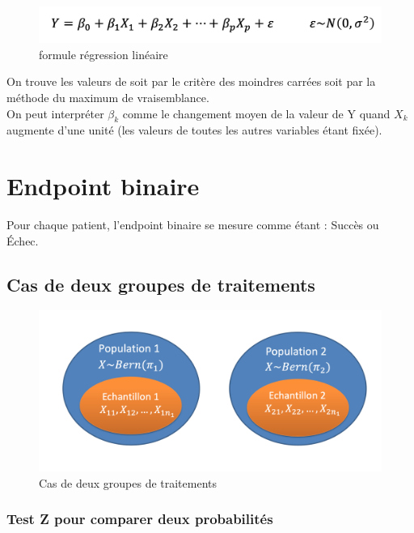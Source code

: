\begin{figure}[H]
    \centering
    \includegraphics[scale = 0.5]{images/regressionlineaire.png}
    \caption{formule régression linéaire}
    \label{fig:my_label}
\end{figure}
On trouve les valeurs de  soit par le critère des moindres carrées soit par la méthode du maximum de vraisemblance.\\

On peut interpréter $\beta_k$ comme le changement moyen de la valeur de Y quand $X_{k}$ augmente d’une unité (les valeurs de toutes les autres variables étant fixée).

\section{Endpoint binaire}
Pour chaque patient, l’endpoint binaire se mesure comme étant : Succès ou Échec. 

\subsection{Cas de deux groupes de traitements}

\begin{figure}[H]
    \centering
    \includegraphics[scale = 0.5]{images/deuxgroupesbinaires.png}
    \caption{Cas de deux groupes de traitements}
    \label{fig:my_label}
\end{figure}

\subsubsection{Test Z pour comparer deux probabilités}

